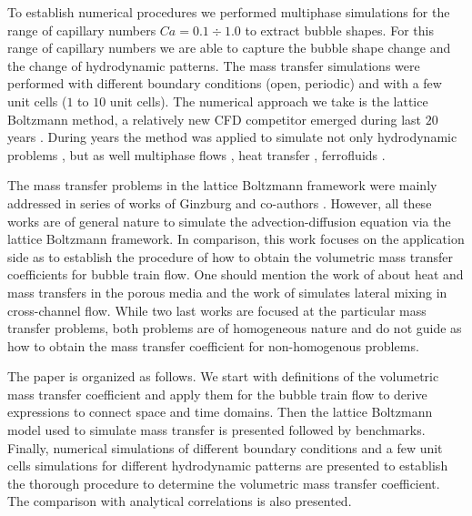 \documentclass{article}
\begin{document}
To establish numerical procedures we performed multiphase simulations \cite{kuzmin-binary2d,kuzmin-binary3d} for the range of capillary numbers $Ca=0.1\div 1.0$ to extract bubble shapes. For this range of capillary numbers we are able to capture the bubble shape change and the change of hydrodynamic patterns. The mass transfer simulations were performed with different boundary conditions (open, periodic) and with a few unit cells ($1$ to $10$ unit cells).  The numerical approach we take is the lattice Boltzmann method, a relatively new CFD
competitor emerged during last $20$ years \cite{frisch,mcnamara,HJ,HSB}. During years the
method was applied to simulate not only hydrodynamic problems \cite{yu}, but as well multiphase
flows \cite{Shan-chen:extended,swift,gunstensen}, heat transfer
\cite{yuan-thermal,zhang-thermal}, ferrofluids \cite{dellar-ferro,kuzmin-aniso}.

The mass transfer problems in the lattice Boltzmann framework were mainly addressed in series of
works of Ginzburg and co-authors
\cite{ginzburg-main,ginzburg-boundary-conditions,ginzburg-saturated-flow}. However, all these works
are of general nature to simulate the advection-diffusion equation via the lattice Boltzmann
framework. In comparison, this work focuses on the application side as to establish the procedure of how to obtain the
volumetric mass transfer coefficients for bubble train flow. One should mention the work of
\citet{inamuro-scalar-boundary} about heat and mass transfers in the porous media and the work
of \citet{jos-mass} simulates lateral mixing in cross-channel flow. While two last works are focused
at the particular mass transfer problems, both problems are of homogeneous nature and do not
guide as how to obtain the mass transfer coefficient for non-homogenous problems.           

The paper is organized as follows. We start with definitions of the volumetric mass transfer coefficient and apply them 
for the bubble train flow to derive expressions to connect space and time domains. Then the lattice
Boltzmann model used to simulate mass transfer is presented followed by benchmarks. Finally,
numerical simulations of different boundary conditions and a few unit cells simulations for
different hydrodynamic patterns are presented to establish the thorough procedure to determine the
volumetric mass transfer coefficient. The comparison with analytical correlations is also presented. 
\end{document}
